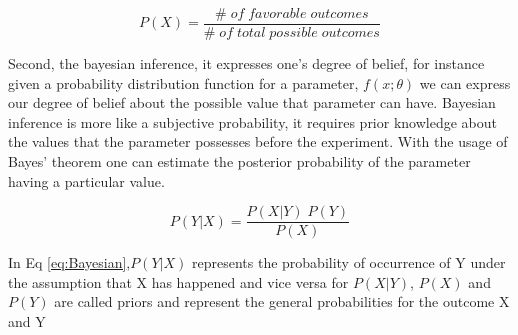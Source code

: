 \begin{equation}
P(X) = \frac{\#\; of\; favorable\; outcomes}{\# \;of\; total\; possible\; outcomes}
  \label{eq:frequentist}
\end{equation}

Second, the bayesian inference, it expresses one's degree of belief, for instance given a probability distribution function for a parameter, $f(x;\theta)$ we can express our degree of belief about the possible value that parameter can have. Bayesian inference is more like a subjective probability, it requires prior knowledge about the values that the parameter possesses before the experiment. With the usage of Bayes' theorem one can estimate the posterior probability of the parameter having a particular value.

\begin{equation}
P(Y|X) = \frac{P(X|Y)\; P(Y)}{P(X)}
  \label{eq:Bayesian}
\end{equation}

In Eq \ref{eq:Bayesian},$P(Y|X)$ represents the probability of occurrence of Y under the assumption that X has happened and vice versa for $P(X|Y)$, $P(X)$ and $P(Y)$ are
called priors and represent the general probabilities for the outcome X and Y

